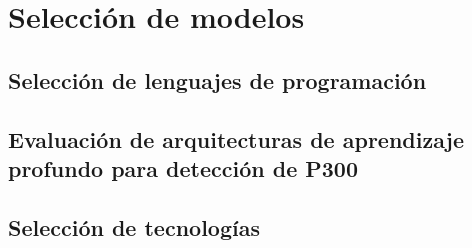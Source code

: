 \chapter[SELECCIÓN DE MODELOS]{Selección de modelos}

\section[SELECCIÓN DE LENGUAJES DE PROGRAMACIÓN]{Selección de lenguajes de programación}

\section[EVALUACIÓN DE ARQUITECTURAS DE APRENDIZAJE PROFUNDO PARA DETECCIÓN DE P300]{Evaluación de arquitecturas de aprendizaje profundo para detección de P300}

\section[SELECCIÓN DE TECNOLOGÍAS]{Selección de tecnologías}
